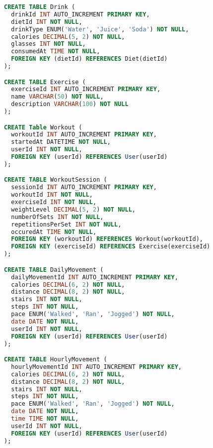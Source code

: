 \documentclass{article}
\begin{document}
\begin{lstlisting}[language=sql]
CREATE TABLE Drink (
  drinkId INT AUTO_INCREMENT PRIMARY KEY,
  dietId INT NOT NULL,
  drinkType ENUM('Water', 'Juice', 'Soda') NOT NULL,
  calories DECIMAL(5, 2) NOT NULL,
  glasses INT NOT NULL,
  consumedAt TIME NOT NULL,
  FOREIGN KEY (dietId) REFERENCES Diet(dietId)
);

CREATE TABLE Exercise (
  exerciseId INT AUTO_INCREMENT PRIMARY KEY,
  name VARCHAR(50) NOT NULL,
  description VARCHAR(100) NOT NULL
);

CREATE Table Workout (
  workoutId INT AUTO_INCREMENT PRIMARY KEY,
  startedAt DATETIME NOT NULL,
  userId INT NOT NULL,
  FOREIGN KEY (userId) REFERENCES User(userId)
);

CREATE TABLE WorkoutSession (
  sessionId INT AUTO_INCREMENT PRIMARY KEY,
  workoutId INT NOT NULL,
  exerciseId INT NOT NULL,
  weightLevel DECIMAL(5, 2) NOT NULL,
  numberOfSets INT NOT NULL,
  repetitionsPerSet INT NOT NULL,
  occuredAt TIME NOT NULL,
  FOREIGN KEY (workoutId) REFERENCES Workout(workoutId),
  FOREIGN KEY (exerciseId) REFERENCES Exercise(exerciseId)
);

CREATE TABLE DailyMovement (
  dailyMovementId INT AUTO_INCREMENT PRIMARY KEY,
  calories DECIMAL(6, 2) NOT NULL,
  distance DECIMAL(8, 2) NOT NULL,
  stairs INT NOT NULL,
  steps INT NOT NULL,
  pace ENUM('Walked', 'Ran', 'Jogged') NOT NULL,
  date DATE NOT NULL,
  userId INT NOT NULL,
  FOREIGN KEY (userId) REFERENCES User(userId)
);

CREATE TABLE HourlyMovement (
  hourlyMovementId INT AUTO_INCREMENT PRIMARY KEY,
  calories DECIMAL(6, 2) NOT NULL,
  distance DECIMAL(8, 2) NOT NULL,
  stairs INT NOT NULL,
  steps INT NOT NULL,
  pace ENUM('Walked', 'Ran', 'Jogged') NOT NULL,
  date DATE NOT NULL,
  time TIME NOT NULL,
  userId INT NOT NULL,
  FOREIGN KEY (userId) REFERENCES User(userId)
);
\end{lstlisting}
\end{document}
